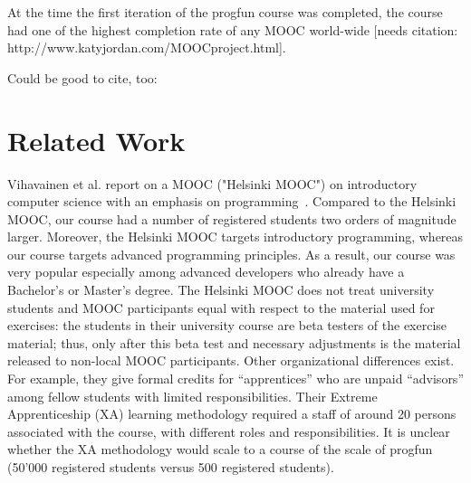 \documentclass{sig-alternate}
\begin{document}
At the time the first iteration of the progfun course was completed, the
course had one of the highest completion rate of any MOOC world-wide [needs
citation: http://www.katyjordan.com/MOOCproject.html].

Could be good to cite, too:~\cite{Parr13}

\section{Related Work}

Vihavainen et al. report on a MOOC ("Helsinki MOOC") on introductory computer
science with an emphasis on programming~\cite{VihavainenLK12}. Compared to the
Helsinki MOOC, our course had a number of registered students two orders of
magnitude larger. Moreover, the Helsinki MOOC targets introductory
programming, whereas our course targets advanced programming principles. As a
result, our course was very popular especially among advanced developers who
already have a Bachelor's or Master's degree. The Helsinki MOOC does not treat
university students and MOOC participants equal with respect to the material
used for exercises: the students in their university course are beta testers
of the exercise material; thus, only after this beta test and necessary
adjustments is the material released to non-local MOOC participants. Other
organizational differences exist. For example, they give formal credits for
``apprentices'' who are unpaid ``advisors'' among fellow students with limited
responsibilities. Their Extreme Apprenticeship (XA) learning methodology
required a staff of around 20 persons associated with the course, with
different roles and responsibilities. It is unclear whether the XA methodology
would scale to a course of the scale of progfun (50'000 registered students
versus 500 registered students).


%

%
%
\end{document}
